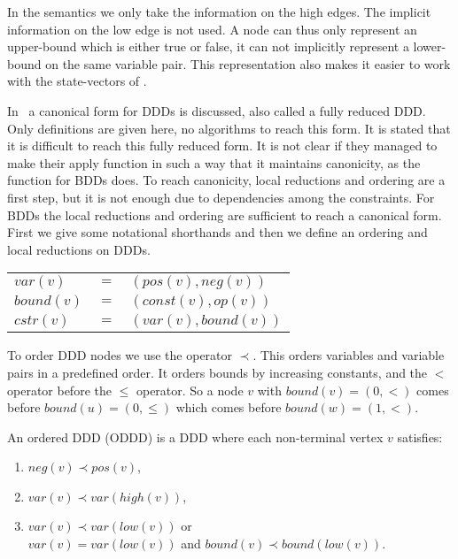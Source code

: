 In the semantics we only take the information on the high edges. The implicit information on the low edge is not used. A node can thus only represent an upper-bound which is either true or false, it can not implicitly represent a lower-bound on the same variable pair. This representation also makes it easier to work with the state-vectors of \ltsmin{}.

In~\cite{ddds} a canonical form for DDDs is discussed, also called a fully reduced DDD. Only definitions are given here, no algorithms to reach this form. It is stated that it is difficult to reach this fully reduced form. It is not clear if they managed to make their apply function in such a way that it maintains canonicity, as the function for BDDs does. To reach canonicity, local reductions and ordering are a first step, but it is not enough due to dependencies among the constraints. For BDDs the local reductions and ordering are sufficient to reach a canonical form. First we give some notational shorthands and then we define an ordering and local reductions on DDDs.
%
\begin{center}
\begin{tabular}{lll}
$var(v)$   & $=$ & $(pos(v),neg(v))$   \\
$bound(v)$ & $=$ & $(const(v),op(v))$  \\
$cstr(v)$  & $=$ & $(var(v),bound(v))$
\end{tabular}
\end{center}

To order DDD nodes we use the operator $\prec$. This orders variables and variable pairs in a predefined order. It orders bounds by increasing constants, and the $<$ operator before the $\leq$ operator. So a node $v$ with $bound(v) = (0,<)$ comes before $bound(u) = (0,\leq)$ which comes before $bound(w) = (1,<)$.

\begin{mydef}
\label{def:ODDD}
An ordered DDD (ODDD) is a DDD where each non-terminal vertex $v$ satisfies:
\begin{enumerate}
  \item $neg(v) \prec pos(v)$,
  \item $var(v) \prec var(high(v))$,
  \item $var(v) \prec var(low(v))$ or \\ $var(v) = var(low(v))$ and $bound(v) \prec bound(low(v))$.
\end{enumerate}
\end{mydef}

